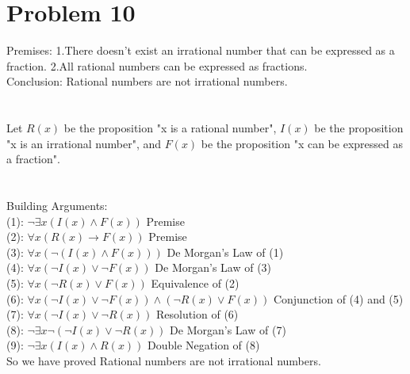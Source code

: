 \documentclass{article}
\begin{document}
\section{Problem 10}
Premises: 1.There doesn’t exist an irrational number that can be expressed as a fraction. 2.All rational numbers can be expressed as fractions.\\
Conclusion: Rational numbers are not irrational numbers.\\
\\ \hspace*{\fill} \\
Let $R(x)$ be the proposition "x is a rational number", $I(x)$ be the proposition "x is an irrational number", and $F(x)$ be the proposition "x can be expressed as a fraction".\\
\\ \hspace*{\fill} \\
Building Arguments:\\
(1): $\neg \exists x (I(x) \wedge F(x))$ Premise\\
(2): $\forall x (R(x) \rightarrow F(x))$ Premise\\
(3): $\forall x (\neg (I(x) \wedge F(x)))$ De Morgan's Law of (1)\\
(4): $\forall x (\neg I(x) \vee \neg F(x))$ De Morgan's Law of (3)\\
(5): $\forall x (\neg R(x) \vee F(x))$ Equivalence of (2)\\
(6): $\forall x (\neg I(x) \vee \neg F(x)) \wedge (\neg R(x) \vee F(x))$ Conjunction of (4) and (5)\\
(7): $\forall x (\neg I(x) \vee \neg R(x))$ Resolution of (6)\\
(8): $\neg \exists x \neg (\neg I(x) \vee \neg R(x))$ De Morgan's Law of (7)\\
(9): $\neg \exists x (I(x) \wedge R(x))$ Double Negation of (8)\\
So we have proved Rational numbers are not irrational numbers.\\
\end{document}
